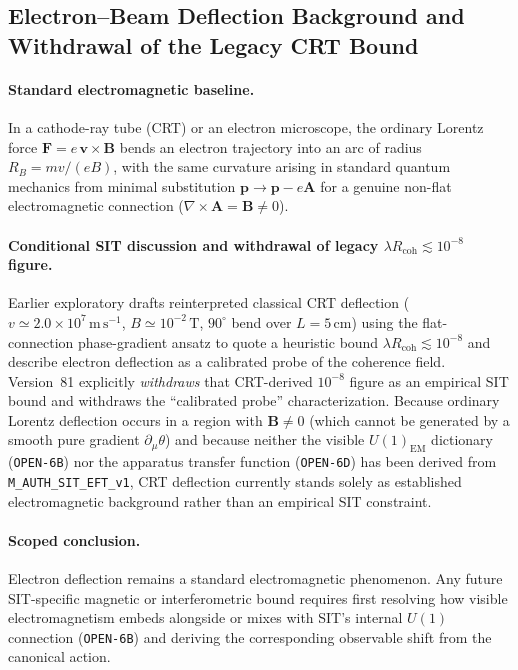 \subsection{Electron--Beam Deflection Background and Withdrawal of the Legacy CRT Bound}
\label{sec:magnet}

\paragraph{Standard electromagnetic baseline.}
In a cathode-ray tube (CRT) or an electron microscope, the ordinary Lorentz force
$\boldsymbol{F}=e\,\boldsymbol{v}\!\times\!\boldsymbol{B}$ bends an electron
trajectory into an arc of radius
$R_{\!B}=mv/(eB)$, with the same curvature arising in standard quantum mechanics from minimal substitution
$\boldsymbol{p}\to\boldsymbol{p}-e\boldsymbol{A}$ for a genuine non-flat electromagnetic connection ($\nabla\times\boldsymbol{A} = \boldsymbol{B} \ne 0$).

\paragraph{Conditional SIT discussion and withdrawal of legacy $\lambda R_{\mathrm{coh}} \lesssim 10^{-8}$ figure.}
Earlier exploratory drafts reinterpreted classical CRT deflection ($v \simeq 2.0\times 10^{7}\,\mathrm{m\,s^{-1}}$, $B \simeq 10^{-2}\,\mathrm{T}$, $90^\circ$ bend over $L = 5\,\mathrm{cm}$) using the flat-connection phase-gradient ansatz to quote a heuristic bound $\lambda R_{\mathrm{coh}} \lesssim 10^{-8}$ and describe electron deflection as a calibrated probe of the coherence field. Version~81 explicitly \emph{withdraws} that CRT-derived $10^{-8}$ figure as an empirical SIT bound and withdraws the ``calibrated probe'' characterization. Because ordinary Lorentz deflection occurs in a region with $\boldsymbol{B} \ne 0$ (which cannot be generated by a smooth pure gradient $\partial_\mu\theta$) and because neither the visible $U(1)_{\mathrm{EM}}$ dictionary (\texttt{OPEN-6B}) nor the apparatus transfer function (\texttt{OPEN-6D}) has been derived from \texttt{M\_AUTH\_SIT\_EFT\_v1}, CRT deflection currently stands solely as established electromagnetic background rather than an empirical SIT constraint.

\paragraph{Scoped conclusion.}
Electron deflection remains a standard electromagnetic phenomenon. Any future SIT-specific magnetic or interferometric bound requires first resolving how visible electromagnetism embeds alongside or mixes with SIT's internal $U(1)$ connection (\texttt{OPEN-6B}) and deriving the corresponding observable shift from the canonical action.

